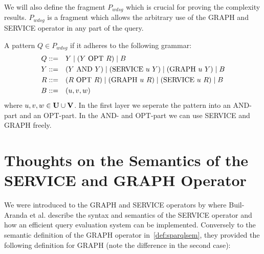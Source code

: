 		We will also define the fragment $P_{wdsg}$ which is crucial for proving the
		complexity results. $P_{wdsg}$ is a fragment which allows the arbitrary use of
		the GRAPH and SERVICE operator in any part of the query.
		\begin{definition}[$P_{wdsg}$]
			A pattern $Q \in P_{wdsg}$ if it adheres to the following grammar:
			\begin{align*}
				Q::= &\quad Y \mid (Y \mbox{ OPT } R)  \mid B \\
				Y::= &\quad (Y \mbox{ AND } Y) \mid (\mbox{SERVICE } u \ Y) \mid (\mbox{GRAPH } u \
				Y) \mid  B\\
				R::= &\quad(R \mbox{ OPT } R) \mid (\mbox{GRAPH } u \ R) \mid (\mbox{SERVICE } u \ R) \mid B  \\
				B::= &\quad(u,v,w)
			\end{align*}
			where	$u,v,w \in \mathbf{U} \cup \mathbf{V}$. In the first layer we seperate the pattern
			into an AND-part and an OPT-part. In the AND- and OPT-part we can use
			SERVICE and GRAPH freely.
		\end{definition}

		\section{Thoughts on the Semantics of the SERVICE and GRAPH Operator}
		We were introduced to the GRAPH and
		SERVICE operators by \cite{BuilAranda20131} where Buil-Aranda et al.
		describe the syntax and semantics of the SERVICE operator and how an efficient query
		evaluation system can be implemented. 
		Conversely to the semantic definition of the GRAPH operator in~\ref{def:sparqlsem}, they provided the
		following definition for GRAPH (note the difference in the second case):	


